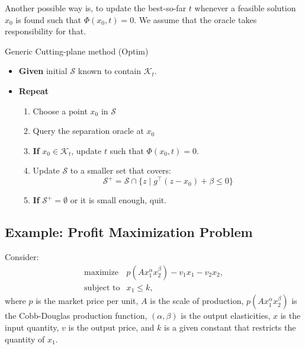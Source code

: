 \documentclass[final,leqno]{siamltex}
\providecommand{\tightlist}{%
  \setlength{\itemsep}{0pt}\setlength{\parskip}{0pt}}
\begin{document}
Another possible way is, to update the best-so-far \(t\) whenever a feasible solution \(x_0\) is found such that \(\Phi(x_0, t) = 0\). We assume that the oracle takes responsibility for that.

Generic Cutting-plane method (Optim)

\begin{itemize}
\tightlist
\item
  \textbf{Given} initial \(\mathcal{S}\) known to contain \(\mathcal{K}_t\).
\item
  \textbf{Repeat}

  \begin{enumerate}
  \def\labelenumi{\arabic{enumi}.}
  \tightlist
  \item
    Choose a point \(x_0\) in \(\mathcal{S}\)
  \item
    Query the separation oracle at \(x_0\)
  \item
    \textbf{If} \(x_0 \in \mathcal{K}_t\), update \(t\) such that
    \(\Phi(x_0, t) = 0\).
  \item
    Update \(\mathcal{S}\) to a smaller set that covers:
    \[\mathcal{S}^+ = \mathcal{S} \cap \{z \mid g^\top (z - x_0) + \beta \leq 0\} \]
  \item
    \textbf{If} \(\mathcal{S}^+ = \emptyset\) or it is small enough, quit.
  \end{enumerate}
\end{itemize}

\hypertarget{sec:example-profit-maximization-problem}{%
\subsection{Example: Profit Maximization Problem}\label{sec:example-profit-maximization-problem}}

Consider:
\begin{equation}\begin{array}{ll}
   \text{maximize} & p(A x_1^\alpha x_2^\beta) - v_1 x_1 - v_2 x_2, \\
   \text{subject to}& x_1 \le k,
  \end{array}
\label{eq:profit-max-in-original-form}\end{equation}
where
\(p\) is the market price per unit,
\(A\) is the scale of production,
\(p(A x_1^\alpha x_2^\beta)\) is the Cobb-Douglas production function,
\((\alpha, \beta)\) is the output elasticities,
\(x\) is the input quantity,
\(v\) is the output price, and
\(k\) is a given constant that restricts the quantity of \(x_1\).
\end{document}
